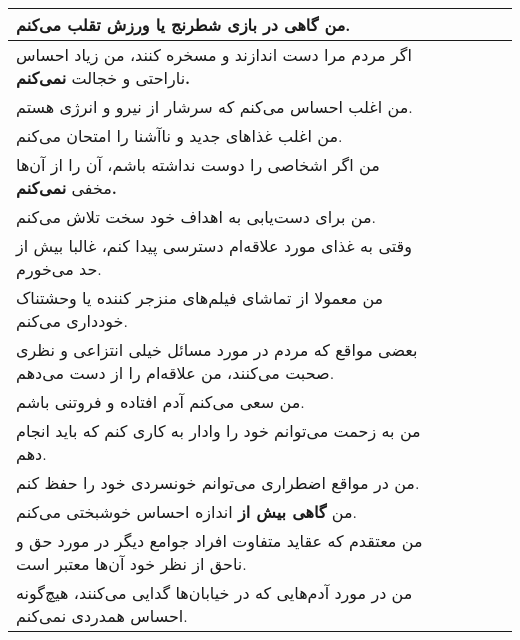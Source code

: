 \documentclass[a4paper,10pt]{article}
\begin{document}
\begin{center}
\begin{tabular}{|p{6cm}|c|c|c|c|c|}
من گاهی در بازی شطرنج یا ورزش تقلب می‌کنم.& & & & & \\
\hline

اگر مردم مرا دست اندازند و مسخره کنند، من زیاد احساس ناراحتی و خجالت \textbf{نمی‌کنم.}& & & & & \\
\hline

من اغلب احساس می‌کنم که سرشار از نیرو و انرژی هستم.& & & & & \\
\hline

من اغلب غذاهای جدید و ناآشنا را امتحان می‌کنم.& & & & & \\
\hline

من اگر اشخاصی را دوست نداشته باشم، آن را از آن‌ها مخفی \textbf{نمی‌کنم.}& & & & & \\
\hline

من برای دست‌یابی به اهداف خود سخت تلاش می‌کنم.& & & & & \\
\hline

وقتی به غذای مورد علاقه‌ام دسترسی پیدا کنم، غالبا بیش از حد می‌خورم.& & & & & \\
\hline

من معمولا از تماشای فیلم‌های منزجر کننده یا وحشتناک خودداری می‌کنم.& & & & & \\
\hline

بعضی مواقع که مردم در مورد مسائل خیلی انتزاعی و نظری صحبت می‌کنند، من علاقه‌ام را از دست می‌دهم.& & & & & \\
\hline

من سعی می‌کنم آدم افتاده و فروتنی باشم.& & & & & \\
\hline

من به زحمت می‌توانم خود را وادار به کاری کنم که باید انجام دهم.& & & & & \\
\hline

من در مواقع اضطراری می‌توانم خونسردی خود را حفظ کنم.& & & & & \\
\hline

من \textbf{گاهی بیش از} اندازه احساس خوشبختی می‌کنم.& & & & & \\
\hline

من معتقدم که عقاید متفاوت افراد جوامع دیگر در مورد حق و ناحق از نظر خود آن‌ها معتبر است.& & & & & \\
\hline

من در مورد آدم‌هایی که در خیابان‌ها گدایی می‌کنند، هیچ‌گونه احساس همدردی نمی‌کنم.& & & & & \\
\hline


\end{tabular}
\end{center}
\end{document}
